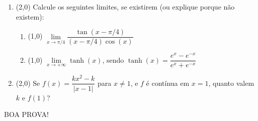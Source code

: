 \documentclass[12pt,a4paper]{article}
\newcommand*\abs[1]{\left|#1\right|}
\begin{document}
\begin{enumerate}
\item (2,0) Calcule os seguintes limites, se existirem (ou explique porque não existem):
\begin{enumerate}
\item (1,0) $\lim\limits_{x\to \pi/4} \dfrac{\tan(x-\pi/4)}{(x-\pi/4)\cos(x)}$
\item (1,0) $\lim\limits_{x\to +\infty} \tanh(x)$, sendo $\tanh(x) = \dfrac{e^x-e^{-x}}{e^x+e^{-x}}$
\end{enumerate}

\item (2,0) Se $f(x) = \dfrac{k x^2 - k}{\abs{x-1}}$ para $x \neq 1$, e $f$ é contínua em $x=1$, quanto valem $k$ e $f(1)$?

\end{enumerate}

\begin{center}
BOA PROVA!
\end{center}

\newpage
\restoregeometry
\end{document}
